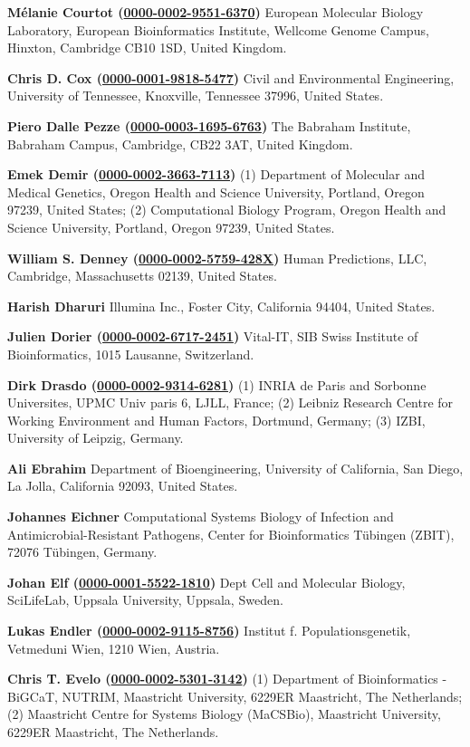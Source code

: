 \documentclass{sbml-paper}
\newcommand{\orcid}[1]{\href{https://orcid.org/#1}{#1}}
\begin{document}
\textbf{Mélanie Courtot (\orcid{0000-0002-9551-6370})} European Molecular Biology Laboratory, European Bioinformatics Institute, Wellcome Genome Campus, Hinxton, Cambridge CB10 1SD, United Kingdom.

\textbf{Chris D. Cox (\orcid{0000-0001-9818-5477})} Civil and Environmental Engineering, University of Tennessee, Knoxville, Tennessee 37996, United States.

\textbf{Piero Dalle Pezze (\orcid{0000-0003-1695-6763})} The Babraham Institute, Babraham Campus, Cambridge, CB22 3AT, United Kingdom.

\textbf{Emek Demir (\orcid{0000-0002-3663-7113})} (1) Department of Molecular and Medical Genetics, Oregon Health and Science University, Portland, Oregon 97239, United States; (2) Computational Biology Program, Oregon Health and Science University, Portland, Oregon 97239, United States.

\textbf{William S. Denney (\orcid{0000-0002-5759-428X})} Human Predictions, LLC, Cambridge, Massachusetts 02139, United States.

\textbf{Harish Dharuri} Illumina Inc., Foster City, California 94404, United States.

\textbf{Julien Dorier (\orcid{0000-0002-6717-2451})} Vital-IT, SIB Swiss Institute of Bioinformatics, 1015 Lausanne, Switzerland.

\textbf{Dirk Drasdo (\orcid{0000-0002-9314-6281})} (1) INRIA de Paris and Sorbonne Universites, UPMC Univ paris 6, LJLL, France; (2) Leibniz Research Centre for Working Environment and Human Factors, Dortmund, Germany; (3) IZBI, University of Leipzig, Germany.

\textbf{Ali Ebrahim} Department of Bioengineering, University of California, San Diego, La Jolla, California 92093, United States.

\textbf{Johannes Eichner} Computational Systems Biology of Infection and Antimicrobial-Resistant Pathogens, Center for Bioinformatics Tübingen (ZBIT), 72076 Tübingen, Germany.

\textbf{Johan Elf (\orcid{0000-0001-5522-1810})} Dept Cell and Molecular Biology, SciLifeLab, Uppsala University, Uppsala, Sweden.

\textbf{Lukas Endler (\orcid{0000-0002-9115-8756})} Institut f. Populationsgenetik, Vetmeduni  Wien, 1210 Wien, Austria.

\textbf{Chris T. Evelo (\orcid{0000-0002-5301-3142})} (1) Department of Bioinformatics - BiGCaT, NUTRIM, Maastricht University, 6229ER Maastricht, The Netherlands; (2) Maastricht Centre for Systems Biology (MaCSBio), Maastricht University, 6229ER Maastricht, The Netherlands.
\end{document}
